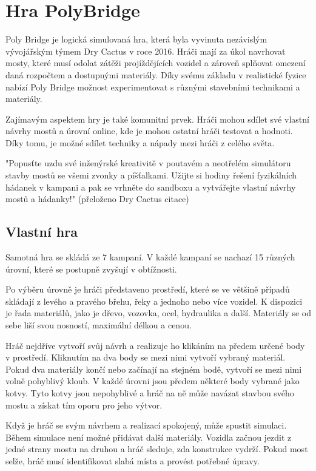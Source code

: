 \chapter{Hra PolyBridge}

Poly Bridge je logická simulovaná hra, která byla vyvinuta nezávislým vývojářským týmem Dry Cactus v roce 2016. Hráči mají za úkol navrhovat mosty, které musí odolat zátěži projíždějících vozidel a zároveň splňovat omezení daná rozpočtem a dostupnými materiály. Díky svému základu v realistické fyzice nabízí Poly Bridge možnost experimentovat s různými stavebními technikami a materiály.

Zajímavým aspektem hry je také komunitní prvek. Hráči mohou sdílet své vlastní návrhy mostů a úrovní online, kde je mohou ostatní hráči testovat a hodnoti. Díky tomu, je možné sdílet techniky a nápady mezi hráči z celého světa. 

"Popusťte uzdu své inženýrské kreativitě v poutavém a neotřelém simulátoru stavby mostů se všemi zvonky a píšťalkami. Užijte si hodiny řešení fyzikálních hádanek v kampani a pak se vrhněte do sandboxu a vytvářejte vlastní návrhy mostů a hádanky!" (přeloženo Dry Cactus citace)

\section{Vlastní hra}

Samotná hra se skládá ze 7 kampaní. V každé kampaní se nachazí 15 různých úrovní, které se postupně zvyšují v obtížnosti.

Po výběru úrovně je hráči představeno prostředí, které se ve většině případů skládají z levého a pravého břehu, řeky a jednoho nebo více vozidel. K dispozici je řada materiálů, jako je dřevo, vozovka, ocel, hydraulika a další. Materiály se od sebe liší svou nosností, maximální délkou a cenou.

Hráč nejdříve vytvoří svůj návrh a realizuje ho klikáním na předem určené body v prostředí. Kliknutím na dva body se mezi nimi vytvoří vybraný materiál. Pokud dva materiály končí nebo začínají na stejném bodě, vytvoří se mezi nimi volně pohyblivý kloub. V každé úrovni jsou předem některé body vybrané jako kotvy. Tyto kotvy jsou nepohyblivé a hráč na ně může navázat stavbou svého mostu a získat tím oporu pro jeho výtvor.

Když je hráč se svým návrhem a realizací spokojený, může spustit simulaci. Během simulace není možné přidávat další materiály. Vozidla začnou jezdit z jedné strany mostu na druhou a hráč sleduje, zda konstrukce vydrží. Pokud most selže, hráč musí identifikovat slabá místa a provést potřebné úpravy.

